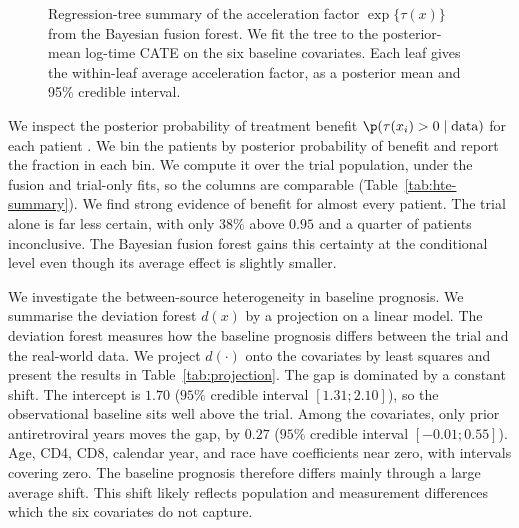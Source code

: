 \begin{figure}[!tb]
{}
  \caption{Regression-tree summary of the acceleration factor
    $\exp\{\tau(x)\}$ from the Bayesian fusion forest. We fit the tree to the
    posterior-mean log-time CATE on the six baseline covariates. Each leaf
    gives the within-leaf average acceleration factor, as a posterior mean
    and 95\% credible interval.}
  \label{fig:fit-the-fit}
\end{figure}

We inspect the posterior probability of treatment benefit $\p(\tau(x_i) > 0 \mid \text{data})$ for each patient \citep{henderson2020individualized}.
We bin the patients by posterior probability of benefit and report the fraction in each bin.
We compute it over the trial population, under the fusion and trial-only fits, so the columns are comparable (Table~\ref{tab:hte-summary}).
We find strong evidence of benefit for almost every patient.
The trial alone is far less certain, with only $38\%$ above $0.95$ and a quarter of patients inconclusive.
The Bayesian fusion forest gains this certainty at the conditional level even though its average effect is slightly smaller.

We investigate the between-source heterogeneity in baseline prognosis.
We summarise the deviation forest $d(x)$ by a projection on a linear model.
The deviation forest measures how the baseline prognosis differs between the trial and the real-world data.
We project $d(\cdot)$ onto the covariates by least squares and present the results in Table~\ref{tab:projection}.
The gap is dominated by a constant shift.
The intercept is $1.70$ ($95\%$ credible interval $[1.31;2.10]$), so the observational baseline sits well above the trial.
Among the covariates, only prior antiretroviral years moves the gap, by $0.27$ ($95\%$ credible interval $[-0.01;0.55]$).
Age, CD4, CD8, calendar year, and race have coefficients near zero, with intervals covering zero.
The baseline prognosis therefore differs mainly through a large average shift.
This shift likely reflects population and measurement differences which the six covariates do not capture.


